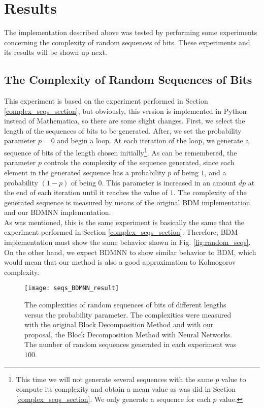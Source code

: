 \section{Results}
The implementation described above was tested by performing some experiments concerning the complexity of random sequences of bits. These experiments and its results will be shown up next. 

\subsection{The Complexity of Random Sequences of Bits}
This experiment is based on the experiment performed in Section \ref{complex_seqs_section}, but obviously, this version is implemented in Python instead of Mathematica, so there are some slight changes. First, we select the length of the sequences of bits to be generated. After, we set the probability parameter $p=0$ and begin a loop. At each iteration of the loop, we generate a sequence of bits of the length chosen initially\footnote{This time we will not generate several sequences with the same $p$ value to compute its complexity and obtain a mean value as was did in Section \ref{complex_seqs_section}. We only generate a sequence for each $p$ value.}. As can be remembered, the parameter $p$ controls the complexity of the sequence generated, since each element in the generated sequence has a probability $p$ of being $1$, and a probability $(1-p)$ of being $0$. This parameter is increased in an amount $dp$ at the end of each iteration until it reaches the value of $1$. The complexity of the generated sequence is measured by means of the original BDM implementation and our BDMNN implementation.\\

As was mentioned, this is the same experiment is basically the same that the experiment performed in Section \ref{complex_seqs_section}. Therefore, BDM implementation must show the same behavior shown in Fig. \ref{fig:random_seqs}. On the other hand, we expect BDMNN to show similar behavior to BDM, which would mean that our method is also a good approximation to Kolmogorov complexity. \\

\begin{figure}[h]
	\centering
		\texttt{[image: seqs\_BDMNN\_result]}
	\caption[The complexities of random sequences of bits, BDM versus BDMNN.]{The complexities of random sequences of bits of different lengths versus the probability parameter. The complexities were measured with the original Block Decomposition Method and with our proposal, the Block Decomposition Method with Neural Networks. The number of random sequences generated in each experiment was $100$.}
	\label{fig:seqs_BDMNN_result}
\end{figure}

